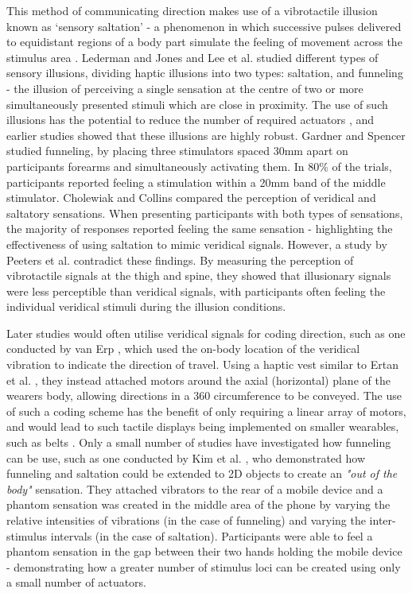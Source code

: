 \documentclass{mpaper}
\begin{document}
This method of communicating direction makes use of a vibrotactile illusion known as ‘sensory saltation' - a phenomenon in which successive pulses delivered to equidistant regions of a body part simulate the feeling of movement across the stimulus area \cite{geldard1975sensory}. Lederman and Jones \cite{5710913} and Lee et al. \cite{s150407913} studied different types of sensory illusions, dividing haptic illusions into two types: saltation, and funneling - the illusion of perceiving a single sensation at the centre of two or more simultaneously presented stimuli which are close in proximity. The use of such illusions has the potential to reduce the number of required actuators \cite{10.1007/s00779-015-0894-4}, and earlier studies showed that these illusions are highly robust. Gardner and Spencer \cite{gardner1972sensory} studied funneling, by placing three stimulators spaced 30mm apart on participants forearms and simultaneously activating them. In 80\% of the trials, participants reported feeling a stimulation within a 20mm band of the middle stimulator. Cholewiak and Collins \cite{cholewiak2000generation} compared the perception of veridical and saltatory sensations. When presenting participants with both types of sensations, the majority of responses reported feeling the same sensation - highlighting the effectiveness of using saltation to mimic veridical signals. However, a study by Peeters et al. \cite{peeters2019vibrotactile} contradict these findings. By measuring the perception of vibrotactile signals at the thigh and spine, they showed that illusionary signals were less perceptible than veridical signals, with participants often feeling the individual veridical stimuli during the illusion conditions.

Later studies would often utilise veridical signals for coding direction, such as one conducted by van Erp \cite{van2000tactile}, which used the on-body location of the veridical vibration to indicate the direction of travel. Using a haptic vest similar to Ertan et al. \cite{729547}, they instead attached motors around the axial (horizontal) plane of the wearers body, allowing directions in a 360\degree{} circumference to be conveyed. The use of such a coding scheme has the benefit of only requiring a linear array of motors, and would lead to such tactile displays being implemented on smaller wearables, such as belts \cite{10.1145/1613858.1613911, 10.1145/2449396.2449450, 10.1145/1060581.1060585}. Only a small number of studies have investigated how funneling can be use, such as one conducted by Kim et al. \cite{10.1007/s00779-015-0894-4}, who demonstrated how funneling and saltation could be extended to 2D objects to create an \textit{"out of the body"} sensation. They attached vibrators to the rear of a mobile device and a phantom sensation was created in the middle area of the phone by varying the relative intensities of vibrations (in the case of funneling) and varying the inter-stimulus intervals (in the case of saltation). Participants were able to feel a phantom sensation in the gap between their two hands holding the mobile device - demonstrating how a greater number of stimulus loci can be created using only a small number of actuators.
\end{document}
